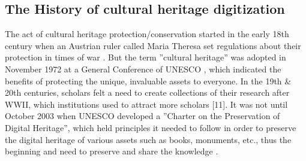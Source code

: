 \documentclass[conference]{IEEEtran}
\begin{document}
\subsection{\textbf{The History of cultural heritage digitization}}

The act of cultural heritage protection/conservation started in the early 18th century when an Austrian ruler called Maria Theresa set regulations about their protection in times of war \cite{germ72}. But the term ”cultural heritage” was adopted in November 1972 at a General Conference of UNESCO \cite{batisse01}, which indicated the benefits of protecting the unique, invaluable assets to everyone. In the 19th \& 20th centuries, scholars felt a need to create collections of their research after WWII, which institutions used to attract more scholars [11]. It was not until October 2003 when UNESCO developed a ”Charter on the Preservation of Digital Heritage”, which held principles it needed to follow in order to preserve the digital heritage of various assets such as books, monuments, etc., thus the beginning and need to preserve and share the knowledge \cite{charter002}. \\
\end{document}
